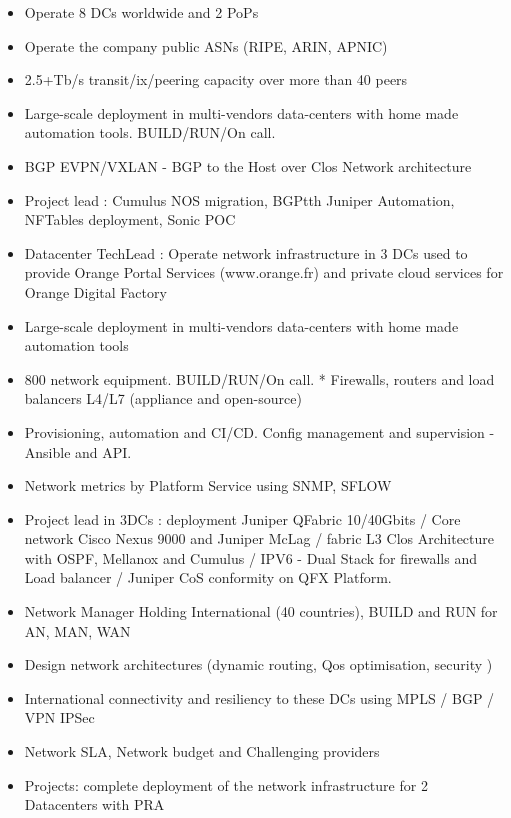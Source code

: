 \documentclass[10pt,a4paper,ragged2e,withhyper]{altacv}
\begin{document}
\begin{paracol}{2}
\begin{itemize}
\item Operate 8 DCs worldwide and 2 PoPs
\item Operate the company public ASNs (RIPE, ARIN, APNIC)
\item 2.5+Tb/s transit/ix/peering capacity over more than 40 peers
\item Large-scale deployment in multi-vendors data-centers with home made automation tools. BUILD/RUN/On call.
\item BGP EVPN/VXLAN - BGP to the Host over Clos Network architecture
\item Project lead : Cumulus NOS migration, BGPtth Juniper Automation, NFTables deployment, Sonic POC
\end{itemize}
\begin{itemize}
\item Datacenter TechLead : Operate network infrastructure in 3 DCs used to provide Orange Portal Services (www.orange.fr) and private cloud services for Orange Digital Factory
\item Large-scale deployment in multi-vendors data-centers with home made automation tools
\item 800 network equipment. BUILD/RUN/On call.
* Firewalls, routers and load balancers L4/L7 (appliance and open-source)
\item Provisioning, automation and CI/CD. Config management and supervision - Ansible and API.
\item Network metrics by Platform Service using SNMP, SFLOW
\item Project lead in 3DCs : deployment Juniper QFabric 10/40Gbits / Core network Cisco Nexus 9000 and Juniper McLag / fabric L3 Clos Architecture with OSPF, Mellanox and Cumulus / IPV6 - Dual Stack for firewalls and Load balancer / Juniper CoS conformity on QFX Platform.
\end{itemize}
\begin{itemize}
\item Network Manager Holding International (40 countries), BUILD and RUN for AN, MAN, WAN
\item Design network architectures (dynamic routing, Qos optimisation, security )
\item International connectivity and resiliency to these DCs using MPLS / BGP / VPN IPSec
\item Network SLA, Network budget and Challenging providers
\item Projects: complete deployment of the network infrastructure for 2 Datacenters with PRA
\end{itemize}


\end{paracol}
\end{document}

